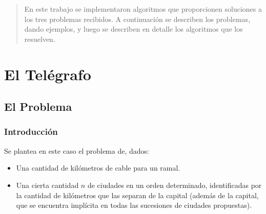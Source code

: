 \documentclass[11pt]{article}
\begin{document}
\subtitulo{}

\fecha{\today}

\grupo{}


\maketitle

\thispagestyle{empty}
\vspace{3cm}
\tableofcontents
\newpage
\vfill

\begin{abstract}
En este trabajo se implementaron algoritmos que proporcionen soluciones a los tres problemas recibidos. A continuación se describen los problemas, dando ejemplos, y luego se describen en detalle los algoritmos que los resuelven.
\end{abstract}

\newpage



\section{El Telégrafo}

\subsection{El Problema}

\subsubsection{Introducción}
Se plantea en este caso el problema de, dados:
\begin{itemize}

\item Una cantidad de kilómetros de cable para un ramal.

\item Una cierta cantidad $n$ de ciudades en un orden determinado, identificadas por la cantidad de kilómetros que las separan de la capital (además de la capital, que se encuentra implícita en todas las sucesiones de ciudades propuestas).

\end{itemize}
\end{document}
